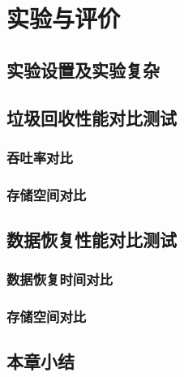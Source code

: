 
\chapter{实验与评价}

\section{实验设置及实验复杂}

\section{垃圾回收性能对比测试}

\subsection{吞吐率对比}

\subsection{存储空间对比}

\section{数据恢复性能对比测试}

\subsection{数据恢复时间对比}

\subsection{存储空间对比}

\section{本章小结}

